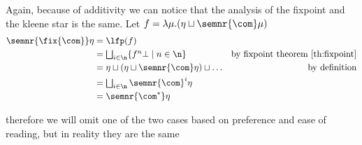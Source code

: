 Again, because of additivity we can notice that the analysis of the
fixpoint and the kleene star is the same. Let
\(f = \lambda \mu . (\eta \sqcup \semnr{\com}\mu)\)
\begin{align*}
  \semnr{\fix{\com}}\eta & = \lfp(f) \\
                         & = \textstyle\bigsqcup_{i\in\n}\{f^n\bot \mid n \in \n\} & \text{by fixpoint theorem \ref{th:fixpoint}}\\
                         & = \eta \sqcup (\eta \sqcup \semnr{\com}\eta) \sqcup \dots & \text{by definition}\\
                         & = \textstyle\bigsqcup_{i\in\n}\semnr{\com}^i\eta \\
                         & = \semnr{\com^*}\eta
\end{align*}

therefore we will omit one of the two cases based on preference and
ease of reading, but in reality they are the same
